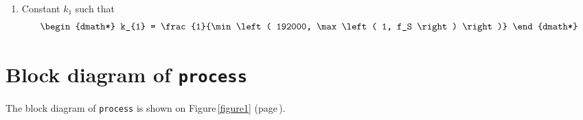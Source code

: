 \documentclass{article}
\begin{document}
\begin{enumerate}
\item Constant $k_1$ such that
	\begin{dgroup*}
		\begin{dmath*}
				k_{1} = \frac{1}{\min\left( 192000, \max\left( 1, f_S \right) \right)}
		\end{dmath*}
	\end{dgroup*}

\end{enumerate}

 \section{Block diagram of \texttt{process}} \label{diagram}  The block diagram of \texttt{process} is shown on Figure\,\ref{figure1} (page\,\pageref{figure1}). \begin{figure}[ht!]
	\centering

\end{figure}
\end{document}
